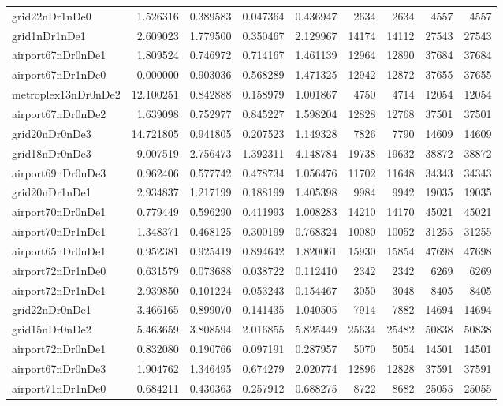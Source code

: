 \begin{longtable}{|l|r|r|r|r|r|r|r|r|}
grid22nDr1nDe0 & 1.526316 & 0.389583 & 0.047364 & 0.436947 & 2634 & 2634 & 4557 & 4557 \\
grid1nDr1nDe1 & 2.609023 & 1.779500 & 0.350467 & 2.129967 & 14174 & 14112 & 27543 & 27543 \\
airport67nDr0nDe1 & 1.809524 & 0.746972 & 0.714167 & 1.461139 & 12964 & 12890 & 37684 & 37684 \\
airport67nDr1nDe0 & 0.000000 & 0.903036 & 0.568289 & 1.471325 & 12942 & 12872 & 37655 & 37655 \\
metroplex13nDr0nDe2 & 12.100251 & 0.842888 & 0.158979 & 1.001867 & 4750 & 4714 & 12054 & 12054 \\
airport67nDr0nDe2 & 1.639098 & 0.752977 & 0.845227 & 1.598204 & 12828 & 12768 & 37501 & 37501 \\
grid20nDr0nDe3 & 14.721805 & 0.941805 & 0.207523 & 1.149328 & 7826 & 7790 & 14609 & 14609 \\
grid18nDr0nDe3 & 9.007519 & 2.756473 & 1.392311 & 4.148784 & 19738 & 19632 & 38872 & 38872 \\
airport69nDr0nDe3 & 0.962406 & 0.577742 & 0.478734 & 1.056476 & 11702 & 11648 & 34343 & 34343 \\
grid20nDr1nDe1 & 2.934837 & 1.217199 & 0.188199 & 1.405398 & 9984 & 9942 & 19035 & 19035 \\
airport70nDr0nDe1 & 0.779449 & 0.596290 & 0.411993 & 1.008283 & 14210 & 14170 & 45021 & 45021 \\
airport70nDr1nDe1 & 1.348371 & 0.468125 & 0.300199 & 0.768324 & 10080 & 10052 & 31255 & 31255 \\
airport65nDr0nDe1 & 0.952381 & 0.925419 & 0.894642 & 1.820061 & 15930 & 15854 & 47698 & 47698 \\
airport72nDr1nDe0 & 0.631579 & 0.073688 & 0.038722 & 0.112410 & 2342 & 2342 & 6269 & 6269 \\
airport72nDr1nDe1 & 2.939850 & 0.101224 & 0.053243 & 0.154467 & 3050 & 3048 & 8405 & 8405 \\
grid22nDr0nDe1 & 3.466165 & 0.899070 & 0.141435 & 1.040505 & 7914 & 7882 & 14694 & 14694 \\
grid15nDr0nDe2 & 5.463659 & 3.808594 & 2.016855 & 5.825449 & 25634 & 25482 & 50838 & 50838 \\
airport72nDr0nDe1 & 0.832080 & 0.190766 & 0.097191 & 0.287957 & 5070 & 5054 & 14501 & 14501 \\
airport67nDr0nDe3 & 1.904762 & 1.346495 & 0.674279 & 2.020774 & 12896 & 12828 & 37591 & 37591 \\
airport71nDr1nDe0 & 0.684211 & 0.430363 & 0.257912 & 0.688275 & 8722 & 8682 & 25055 & 25055 \\

\end{longtable}

